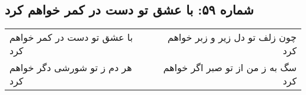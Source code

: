 \begin{center}
\section*{شماره ۵۹: با عشق تو دست در کمر خواهم کرد}
\label{sec:059}
\begin{longtable}{l p{0.5cm} r}
با عشق تو دست در کمر خواهم کرد
&&
چون زلف تو دل زیر و زبر خواهم کرد
\\
هر دم ز تو شورشی دگر خواهم کرد
&&
سگ به ز من از تو صبر اگر خواهم کرد
\\
\end{longtable}
\end{center}
